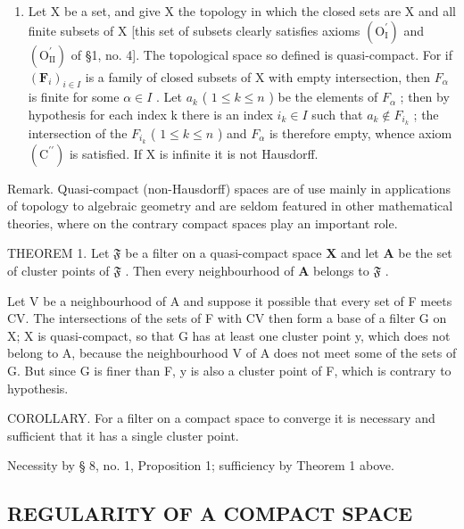 \begin{enumerate}
\def\labelenumi{\arabic{enumi})}
\setcounter{enumi}{1}
\tightlist
\item
  Let X be a set, and give X the topology in which the closed sets are X and all finite subsets of X {[}this set of subsets clearly satisfies axioms \((\mathrm{O}_{\mathrm{I}}^{\prime})\) and \((\mathrm{O}_{\mathrm{II}}^{\prime})\) of §1, no. 4{]}. The topological space so defined is quasi-compact. For if \((\mathbf{F}_{i})_{i\in I}\) is a family of closed subsets of X with empty intersection, then \(F_{\alpha}\) is finite for some \(\alpha\in I\) . Let \(a_{k}\) ( \(1\leqslant k\leqslant n\) ) be the elements of \(F_{\alpha}\) ; then by hypothesis for each index k there is an index \(i_{k}\in I\) such that \(a_{k}\notin F_{i_{k}}\) ; the intersection of the \(F_{i_{k}}\) ( \(1\leqslant k\leqslant n\) ) and \(F_{\alpha}\) is therefore empty, whence axiom \((\mathrm{C}^{\prime\prime})\) is satisfied. If X is infinite it is not Hausdorff.
\end{enumerate}

Remark. Quasi-compact (non-Hausdorff) spaces are of use mainly in applications of topology to algebraic geometry and are seldom featured in other mathematical theories, where on the contrary compact spaces play an important role.

THEOREM 1. Let \(\mathfrak{F}\) be a filter on a quasi-compact space \(\mathbf{X}\) and let \(\mathbf{A}\) be the set of cluster points of \(\mathfrak{F}\) . Then every neighbourhood of \(\mathbf{A}\) belongs to \(\mathfrak{F}\) .

Let V be a neighbourhood of A and suppose it possible that every set of F meets CV. The intersections of the sets of F with CV then form a base of a filter G on X; X is quasi-compact, so that G has at least one cluster point y, which does not belong to A, because the neighbourhood V of A does not meet some of the sets of G. But since G is finer than F, y is also a cluster point of F, which is contrary to hypothesis.

COROLLARY. For a filter on a compact space to converge it is necessary and sufficient that it has a single cluster point.

Necessity by § 8, no. 1, Proposition 1; sufficiency by Theorem 1 above.

\subsection{REGULARITY OF A COMPACT SPACE}

